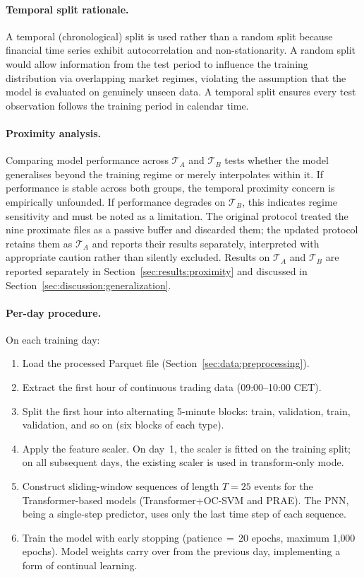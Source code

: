 \documentclass[11pt]{report}
\begin{document}
\paragraph{Temporal split rationale.}
A temporal (chronological) split is used rather than a random split because financial time series exhibit autocorrelation and non-stationarity. A random split would allow information from the test period to influence the training distribution via overlapping market regimes, violating the assumption that the model is evaluated on genuinely unseen data. A temporal split ensures every test observation follows the training period in calendar time.

\paragraph{Proximity analysis.}
Comparing model performance across $\mathcal{T}_A$ and $\mathcal{T}_B$ tests whether the model generalises beyond the training regime or merely interpolates within it. If performance is stable across both groups, the temporal proximity concern is empirically unfounded. If performance degrades on $\mathcal{T}_B$, this indicates regime sensitivity and must be noted as a limitation. The original protocol treated the nine proximate files as a passive buffer and discarded them; the updated protocol retains them as $\mathcal{T}_A$ and reports their results separately, interpreted with appropriate caution rather than silently excluded. Results on $\mathcal{T}_A$ and $\mathcal{T}_B$ are reported separately in Section~\ref{sec:results:proximity} and discussed in Section~\ref{sec:discussion:generalization}.

\paragraph{Per-day procedure.}
On each training day:
\begin{enumerate}
  \item Load the processed Parquet file (Section~\ref{sec:data:preprocessing}).
  \item Extract the first hour of continuous trading data (09:00--10:00 CET).
  \item Split the first hour into alternating 5-minute blocks: train, validation, train, validation, and so on (six blocks of each type).
  \item Apply the feature scaler. On day~1, the scaler is fitted on the training split; on all subsequent days, the existing scaler is used in transform-only mode.
  \item Construct sliding-window sequences of length $T = 25$ events for the Transformer-based models (Transformer+OC-SVM and PRAE). The PNN, being a single-step predictor, uses only the last time step of each sequence.
  \item Train the model with early stopping (patience\,$=$\,20 epochs, maximum 1{,}000 epochs). Model weights carry over from the previous day, implementing a form of continual learning.
\end{enumerate}
\end{document}
